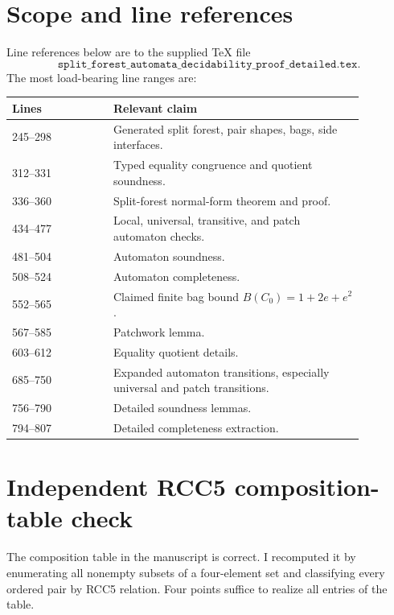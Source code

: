 \documentclass[11pt]{article}
\begin{document}
\section{Scope and line references}

Line references below are to the supplied TeX file
\[
\texttt{split\_forest\_automata\_decidability\_proof\_detailed.tex}.
\]
The most load-bearing line ranges are:
\begin{center}
\begin{tabular}{p{0.25\linewidth}p{0.62\linewidth}}
\toprule
Lines & Relevant claim \\
\midrule
245--298 & Generated split forest, pair shapes, bags, side interfaces. \\
312--331 & Typed equality congruence and quotient soundness. \\
336--360 & Split-forest normal-form theorem and proof. \\
434--477 & Local, universal, transitive, and patch automaton checks. \\
481--504 & Automaton soundness. \\
508--524 & Automaton completeness. \\
552--565 & Claimed finite bag bound $B(C_0)=1+2e+e^2$. \\
567--585 & Patchwork lemma. \\
603--612 & Equality quotient details. \\
685--750 & Expanded automaton transitions, especially universal and patch transitions. \\
756--790 & Detailed soundness lemmas. \\
794--807 & Detailed completeness extraction. \\
\bottomrule
\end{tabular}
\end{center}

\section{Independent RCC5 composition-table check}

The composition table in the manuscript is correct.  I recomputed it by enumerating all nonempty subsets of a four-element set and classifying every ordered pair by RCC5 relation.  Four points suffice to realize all entries of the table.
\end{document}

